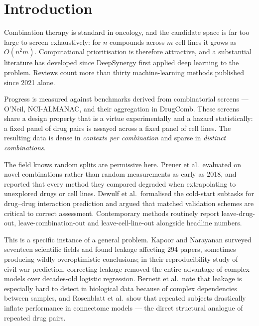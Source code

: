 \documentclass{ws-procs11x85}
\begin{document}


\section{Introduction}\label{sec:intro}

Combination therapy is standard in oncology, and the candidate space is far too
large to screen exhaustively: for $n$ compounds across $m$ cell lines it grows as
$O(n^2m)$. Computational prioritisation is therefore attractive, and a
substantial literature has developed since DeepSynergy first applied deep
learning to the problem.\cite{preuer2018} Reviews count more than thirty
machine-learning methods published since 2021 alone.\cite{abbasi2024,pan2023}

Progress is measured against benchmarks derived from combinatorial screens ---
O'Neil,\cite{oneil2016} NCI-ALMANAC,\cite{holbeck2017} and their aggregation in
DrugComb.\cite{zagidullin2019,zheng2021} These screens share a design property
that is a virtue experimentally and a hazard statistically: a fixed panel of drug
pairs is assayed across a fixed panel of cell lines. The resulting data is dense
in \emph{contexts per combination} and sparse in \emph{distinct combinations}.

The field knows random splits are permissive here. Preuer et al.\ evaluated on
novel combinations rather than random measurements as early as 2018, and reported
that every method they compared degraded when extrapolating to unexplored drugs
or cell lines.\cite{preuer2018} Dewulf et al.\ formalised the cold-start subtasks
for drug--drug interaction prediction and argued that matched validation schemes
are critical to correct assessment.\cite{dewulf2021} Contemporary methods
routinely report leave-drug-out, leave-combination-out and leave-cell-line-out
alongside headline numbers.\cite{monem2024,boonyarit2025,alam2024}

This is a specific instance of a general problem. Kapoor and Narayanan surveyed
seventeen scientific fields and found leakage affecting 294 papers, sometimes
producing wildly overoptimistic conclusions; in their reproducibility study of
civil-war prediction, correcting leakage removed the entire advantage of complex
models over decades-old logistic regression.\cite{kapoor2023,kapoor2022} Bernett
et al.\ note that leakage is especially hard to detect in biological data because
of complex dependencies between samples,\cite{bernett2024} and Rosenblatt et al.\
show that repeated subjects drastically inflate performance in connectome
models\cite{rosenblatt2024} --- the direct structural analogue of repeated drug
pairs.
\end{document}
